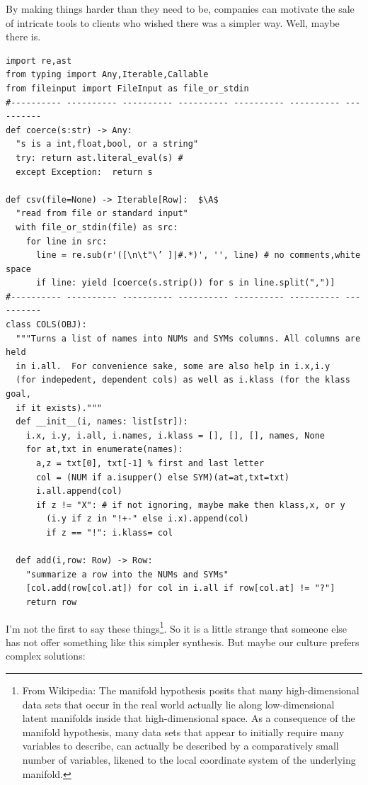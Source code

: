 \documentclass[landscape,	DIV=calc,%
							paper=letter,%
							fontsize=10pt,%
							twocolumn]{scrartcl}	 					%
\newcommand*\circled[1]{\tikz[baseline=(char.base)]{
            \node[minimum width=1pt, shape=circle,fill=black,inner sep=1pt] (char) {{\footnotesize \textcolor{white}{#1}}};}}
\newcommand{\A}{\circled{a}}
\begin{document}
\begin{itemize}
By making things harder than they need to be, companies can motivate
the sale  of intricate tools to clients who wished there was a
simpler way. Well, maybe there is.


\begin{table}[!t]{\linewidth}
\begin{lstlisting}[caption=Python example]
import re,ast
from typing import Any,Iterable,Callable
from fileinput import FileInput as file_or_stdin
#---------- ---------- ---------- ---------- ---------- ---------- ----------
def coerce(s:str) -> Any:
  "s is a int,float,bool, or a string"
  try: return ast.literal_eval(s) # 
  except Exception:  return s

def csv(file=None) -> Iterable[Row]:  $\A$
  "read from file or standard input"
  with file_or_stdin(file) as src: 
    for line in src:
      line = re.sub(r'([\n\t"\’ ]|#.*)', '', line) # no comments,white space
      if line: yield [coerce(s.strip()) for s in line.split(",")]
#---------- ---------- ---------- ---------- ---------- ---------- ----------
class COLS(OBJ): 
  """Turns a list of names into NUMs and SYMs columns. All columns are held 
  in i.all.  For convenience sake, some are also help in i.x,i.y 
  (for indepedent, dependent cols) as well as i.klass (for the klass goal, 
  if it exists)."""
  def __init__(i, names: list[str]): 
    i.x, i.y, i.all, i.names, i.klass = [], [], [], names, None
    for at,txt in enumerate(names):
      a,z = txt[0], txt[-1] % first and last letter
      col = (NUM if a.isupper() else SYM)(at=at,txt=txt)
      i.all.append(col)
      if z != "X": # if not ignoring, maybe make then klass,x, or y
        (i.y if z in "!+-" else i.x).append(col)
        if z == "!": i.klass= col

  def add(i,row: Row) -> Row: 
    "summarize a row into the NUMs and SYMs"
    [col.add(row[col.at]) for col in i.all if row[col.at] != "?"]
    return row
\end{lstlisting}
\end{table}

I'm not the first to say these things\footnote{
From Wikipedia: The manifold hypothesis posits that many
high-dimensional data sets that occur in the real world actually
lie along low-dimensional latent manifolds inside that high-dimensional
space. As a consequence of the manifold hypothesis, many data sets
that appear to initially require many variables to describe, can
actually be described by a comparatively small number of variables,
likened to the local coordinate system of the underlying manifold.}.
So it is a little
strange that someone else has not offer something like this simpler
synthesis. But maybe our culture prefers complex solutions:


\end{itemize}
\end{document}
